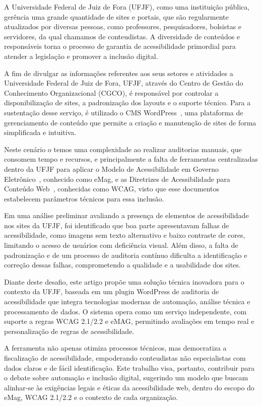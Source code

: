 \documentclass[12pt]{article}
\begin{document}
A Universidade Federal de Juiz de Fora (UFJF), como uma instituição pública,
gerência uma grande quantidade de sites e portais, que são regularmente
atualizados por diversas pessoas, como professores, pesquisadores, bolsistas e
servidores, da qual chamamos de conteudistas. A diversidade de conteúdos e
responsáveis torna o processo de garantia de acessibilidade primordial para
atender a legislação e promover a inclusão digital.

A fim de divulgar as informações referentes aos seus setores e atividades a 
Universidade Federal de Juiz de Fora, UFJF, através do Centro de Gestão 
do Conhecimento Organizacional (CGCO), é responsável por controlar a 
disponibilização de sites, a padronização dos layouts e o suporte técnico. Para
a sustentação desse serviço, é utilizado o CMS WordPress~\autocite{WP},
uma plataforma de gerenciamento de conteúdo que permite a criação e
manutenção de sites de forma simplificada e intuitiva.

Neste cenário o temos uma complexidade ao realizar auditorias manuais, que 
consomem tempo e recursos, e principalmente a falta de ferramentas 
centralizadas dentro da UFJF para aplicar o Modelo de Acessibilidade em 
Governo Eletrônico~\cite{emag}, conhecido como eMag, e as Diretrizes 
de Acessibilidade para Conteúdo Web~\cite{wcag22}, conhecidas como 
WCAG, visto que esse documentos estabelecem parâmetros técnicos para essa inclusão.

Em uma análise preliminar avaliando a presença de elementos de acessibilidade nos
sites da UFJF, foi identificado que boa parte apresentavam falhas de acessibilidade, como imagens sem texto
alternativo e baixo contraste de cores, limitando o acesso de usuários com deficiência
visual. Além disso, a falta de padronização e de um processo de auditoria contínuo
dificulta a identificação e correção dessas falhas, comprometendo a qualidade e a
usabilidade dos sites.

Diante deste desafio, este artigo propõe uma solução técnica inovadora 
para o contexto da UFJF, baseada em um plugin WordPress de auditoria
de acessibilidade que integra tecnologias modernas de automação,
análise técnica e processamento de dados. O sistema opera como um serviço 
independente, com suporte a regras WCAG 2.1/2.2 e eMAG, permitindo 
avaliações em tempo real e personalização de regras de acessibilidade.

A ferramenta não apenas otimiza processos técnicos, mas democratiza 
a fiscalização de acessibilidade, empoderando conteudistas não especialistas 
com dados claros e de fácil identificação. Este trabalho visa, portanto, contribuir
para o debate sobre automação e inclusão digital, sugerindo um modelo que buscam alinhar-se às exigências legais e éticas da
acessibilidade web, dentro do escopo do eMag, WCAG 2.1/2.2 e o contexto de cada
organização.
\end{document}
